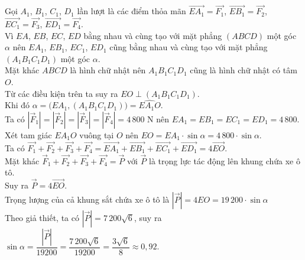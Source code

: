 \begin{bt}
{		Gọi $A_1$, $B_1$, $C_1$, $D_1$ lần lượt là các điểm thỏa mãn $\overrightarrow{EA_1}=\overrightarrow{F_1}$, $\overrightarrow{EB_1}=\overrightarrow{F_2}$, $\overrightarrow{EC_1}=\overrightarrow{F_3}$, $\overrightarrow{ED_1}=\overrightarrow{F_4}$.\\
		Vì $EA$, $EB$, $EC$, $ED$ bằng nhau và cùng tạo với mặt phẳng $(ABCD)$ một góc $\alpha$ nên $EA_1$, $EB_1$, $EC_1$, $ED_1$ cũng bằng nhau và cùng tạo với mặt phẳng $\left(A_1B_1C_1D_1\right)$ một góc $\alpha$.\\
		Mặt khác $ABCD$ là hình chữ nhật nên $A_1B_1C_1D_1$ cũng là hình chữ nhật có tâm $O$.\\
		Từ các điều kiện trên ta suy ra $EO\perp\left(A_1B_1C_1D_1\right)$. \\
		Khi đó $\alpha=\big(EA_1,\left(A_1B_1C_1D_1\right)\big)=\widehat{EA_1O}$.\\
		Ta có $\left|\overrightarrow{F}_1\right|=\left|\overrightarrow{F}_2\right|=\left|\overrightarrow{F}_3\right|=\left|\overrightarrow{F}_4\right|=4\,800$ N nên $EA_1=EB_1=EC_1=ED_1=4\,800$.\\
		Xét tam giác $EA_1O$ vuông tại $O$ nên $EO=EA_1\cdot \sin \alpha=4\,800\cdot \sin \alpha$.\\
		Ta có $\overrightarrow{F_1}+\overrightarrow{F_2}+\overrightarrow{F_3}+\overrightarrow{F_4}=\overrightarrow{EA_1}+\overrightarrow{EB_1}+\overrightarrow{EC_1}+\overrightarrow{ED_1}=4\overrightarrow{EO}$.\\
		Mặt khác $\overrightarrow{F}_1+\overrightarrow{F_2}+\overrightarrow{F_3}+\overrightarrow{F_4}=\overrightarrow{P}$ với $\overrightarrow{P}$ là trọng lực tác động lên khung chứa xe ô tô.\\
		Suy ra $\overrightarrow{P}=4\overrightarrow{EO}$.\\
		Trọng lượng của cả khung sắt chứa xe ô tô là $\left|\overrightarrow{P}\right|=4EO=19\,200\cdot \sin \alpha$\\
		Theo giả thiết, ta có $\left|\overrightarrow{P}\right|=7\,200\sqrt{6}$, suy ra $\sin \alpha=\dfrac{\left|\overrightarrow{P}\right|}{19200}=\dfrac{7\,200\sqrt{6}}{19200}=\dfrac{3\sqrt{6}}{8} \approx 0{,}92$.
	}
\end{bt}

